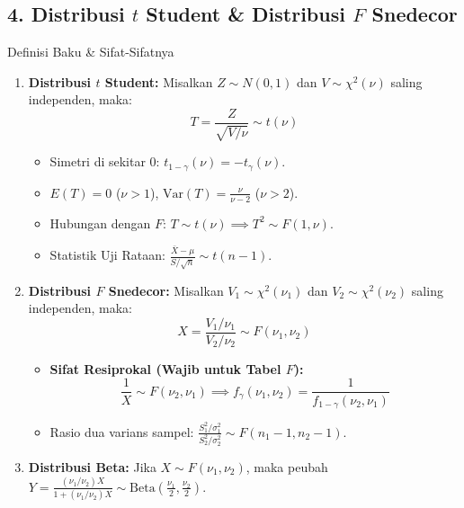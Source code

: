 \documentclass[10pt,twoside]{article}
\begin{document}
\subsection{4. Distribusi $t$ Student \& Distribusi $F$ Snedecor}
\begin{teoribox}{Definisi Baku \& Sifat-Sifatnya}
\begin{enumerate}
  \item \textbf{Distribusi $t$ Student:}
    Misalkan $Z \sim N(0, 1)$ dan $V \sim \chi^2(\nu)$ saling independen, maka:
    \begin{equation*}
      T = \frac{Z}{\sqrt{V/\nu}} \sim t(\nu)
    \end{equation*}
    \begin{itemize}
      \item Simetri di sekitar 0: $t_{1-\gamma}(\nu) = -t_\gamma(\nu)$.
      \item $E(T) = 0$ ($\nu > 1$), $\mathrm{Var}(T) = \frac{\nu}{\nu - 2}$ ($\nu > 2$).
      \item Hubungan dengan $F$: $T \sim t(\nu) \implies T^2 \sim F(1, \nu)$.
      \item Statistik Uji Rataan: $\frac{\bar{X} - \mu}{S/\sqrt{n}} \sim t(n-1)$.
    \end{itemize}
  \item \textbf{Distribusi $F$ Snedecor:}
    Misalkan $V_1 \sim \chi^2(\nu_1)$ dan $V_2 \sim \chi^2(\nu_2)$ saling independen, maka:
    \begin{equation*}
      X = \frac{V_1/\nu_1}{V_2/\nu_2} \sim F(\nu_1, \nu_2)
    \end{equation*}
    \begin{itemize}
      \item \textbf{Sifat Resiprokal (Wajib untuk Tabel $F$):}
        \begin{equation*}
          \frac{1}{X} \sim F(\nu_2, \nu_1) \implies f_\gamma(\nu_1, \nu_2) = \frac{1}{f_{1-\gamma}(\nu_2, \nu_1)}
        \end{equation*}
      \item Rasio dua varians sampel: $\frac{S_1^2/\sigma_1^2}{S_2^2/\sigma_2^2} \sim F(n_1-1, n_2-1)$.
    \end{itemize}
  \item \textbf{Distribusi Beta:}
    Jika $X \sim F(\nu_1, \nu_2)$, maka peubah $Y = \frac{(\nu_1/\nu_2)X}{1 + (\nu_1/\nu_2)X} \sim \text{Beta}\left(\frac{\nu_1}{2}, \frac{\nu_2}{2}\right)$.
\end{enumerate}
\end{teoribox}
\end{document}
